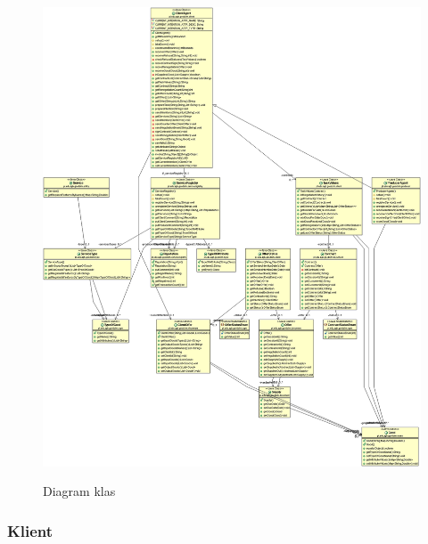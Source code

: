 \documentclass[a4paper,12pt]{article}
\begin{document}
\begin{figure}[!]
\centering
\caption{Diagram klas}
\hspace*{-1.0in}
\includegraphics[scale=0.43]{gfx/PlatformaWymianyDobr-img1.png}
\label{class_diagram}
\end{figure}

\newpage

\subsubsection{Klient}
\end{document}
